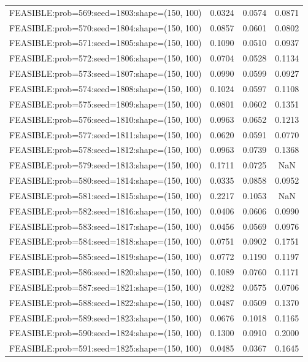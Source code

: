 \begin{longtable}{lccc}
FEASIBLE:prob=569:seed=1803:shape=(150, 100) & 0.0324 & 0.0574 & 0.0871 \\
FEASIBLE:prob=570:seed=1804:shape=(150, 100) & 0.0857 & 0.0601 & 0.0802 \\
FEASIBLE:prob=571:seed=1805:shape=(150, 100) & 0.1090 & 0.0510 & 0.0937 \\
FEASIBLE:prob=572:seed=1806:shape=(150, 100) & 0.0704 & 0.0528 & 0.1134 \\
FEASIBLE:prob=573:seed=1807:shape=(150, 100) & 0.0990 & 0.0599 & 0.0927 \\
FEASIBLE:prob=574:seed=1808:shape=(150, 100) & 0.1024 & 0.0597 & 0.1108 \\
FEASIBLE:prob=575:seed=1809:shape=(150, 100) & 0.0801 & 0.0602 & 0.1351 \\
FEASIBLE:prob=576:seed=1810:shape=(150, 100) & 0.0963 & 0.0652 & 0.1213 \\
FEASIBLE:prob=577:seed=1811:shape=(150, 100) & 0.0620 & 0.0591 & 0.0770 \\
FEASIBLE:prob=578:seed=1812:shape=(150, 100) & 0.0963 & 0.0739 & 0.1368 \\
FEASIBLE:prob=579:seed=1813:shape=(150, 100) & 0.1711 & 0.0725 &    NaN \\
FEASIBLE:prob=580:seed=1814:shape=(150, 100) & 0.0335 & 0.0858 & 0.0952 \\
FEASIBLE:prob=581:seed=1815:shape=(150, 100) & 0.2217 & 0.1053 &    NaN \\
FEASIBLE:prob=582:seed=1816:shape=(150, 100) & 0.0406 & 0.0606 & 0.0990 \\
FEASIBLE:prob=583:seed=1817:shape=(150, 100) & 0.0456 & 0.0569 & 0.0976 \\
FEASIBLE:prob=584:seed=1818:shape=(150, 100) & 0.0751 & 0.0902 & 0.1751 \\
FEASIBLE:prob=585:seed=1819:shape=(150, 100) & 0.0772 & 0.1190 & 0.1197 \\
FEASIBLE:prob=586:seed=1820:shape=(150, 100) & 0.1089 & 0.0760 & 0.1171 \\
FEASIBLE:prob=587:seed=1821:shape=(150, 100) & 0.0282 & 0.0575 & 0.0706 \\
FEASIBLE:prob=588:seed=1822:shape=(150, 100) & 0.0487 & 0.0509 & 0.1370 \\
FEASIBLE:prob=589:seed=1823:shape=(150, 100) & 0.0676 & 0.1018 & 0.1165 \\
FEASIBLE:prob=590:seed=1824:shape=(150, 100) & 0.1300 & 0.0910 & 0.2000 \\
FEASIBLE:prob=591:seed=1825:shape=(150, 100) & 0.0485 & 0.0367 & 0.1645 \\

\end{longtable}
